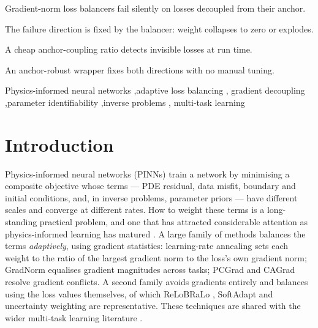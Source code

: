 \documentclass[a4paper,fleqn]{cas-sc}
\begin{document}
\begin{highlights}
\item Gradient-norm loss balancers fail silently on losses decoupled from their anchor.
\item The failure direction is fixed by the balancer: weight collapses to zero or explodes.
\item A cheap anchor-coupling ratio detects invisible losses at run time.
\item An anchor-robust wrapper fixes both directions with no manual tuning.
\end{highlights}

\begin{keywords}
Physics-informed neural networks \sep adaptive loss balancing \sep
gradient decoupling \sep parameter identifiability \sep inverse problems \sep
multi-task learning
\end{keywords}

\maketitle

\section{Introduction}
\label{sec:intro}

Physics-informed neural networks (PINNs) \citep{raissi2019physics,sirignano2018dgm}
train a network by minimising a composite objective whose terms --- PDE
residual, data misfit, boundary and initial conditions, and, in inverse
problems, parameter priors --- have different scales and converge at different
rates. How to weight these terms is a long-standing practical problem, and one
that has attracted considerable attention as physics-informed learning has
matured \citep{karniadakis2021physics,cuomo2022scientific,blechschmidt2021three}.
A large family of methods balances the terms \emph{adaptively}, using gradient
statistics: learning-rate annealing \citep{wang2021understanding} sets each
weight to the ratio of the largest gradient norm to the loss's own gradient
norm; GradNorm \citep{chen2018gradnorm} equalises gradient magnitudes across
tasks; PCGrad \citep{yu2020gradient} and CAGrad \citep{liu2021conflict} resolve
gradient conflicts. A second family avoids gradients entirely and balances
using the loss values themselves, of which ReLoBRaLo \citep{bischof2021multi},
SoftAdapt \citep{heydari2019softadapt} and uncertainty weighting
\citep{kendall2018multi} are representative. These techniques are shared with
the wider multi-task learning literature
\citep{ruder2017overview,crawshaw2020multi}.
\end{document}
